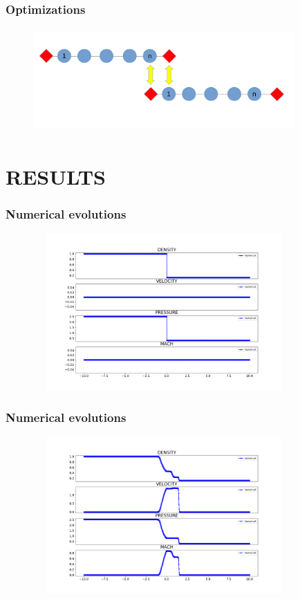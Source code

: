\documentclass{beamer}
\begin{document}
    \begin{frame}
        \frametitle{Optimizations}
            \begin{figure}
                \includegraphics[height = 40mm,width = 100mm]{ghost.png}                
            \end{figure}        
    \end{frame}

    \section{RESULTS}

    \begin{frame}
        \frametitle{Numerical evolutions}
            \begin{figure}
                \includegraphics[height = 60mm,width = 100mm]{shock0.png}             
            \end{figure}        
    \end{frame}
    

    \begin{frame}
        \frametitle{Numerical evolutions}
            \begin{figure}
                \includegraphics[height = 60mm,width = 100mm]{shock2.png}             
            \end{figure}        
    \end{frame}
\end{document}
